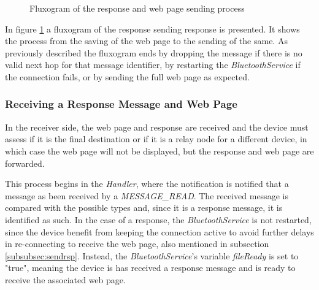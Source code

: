 \begin{figure}[ht]
   \noindent{}
	\caption{\label{fig:rspsendflux} Fluxogram of the response and web page sending process}
\end{figure}

In figure \ref{fig:rspsendflux} a fluxogram of the response sending response is presented. It shows the process from the saving of the web page to the sending of the same. As previously described the fluxogram ends by dropping the message if there is no valid next hop for that message identifier, by restarting the \textit{BluetoothService} if the connection fails, or by sending the full web page as expected.

\subsubsection{Receiving a Response Message and Web Page}
\label{subsubsec:rcvrsp}

In the receiver side, the web page and response are received and the device must assess if it is the final destination or if it is a relay node for a different device, in which case the web page will not be displayed, but the response and web page are forwarded.

This process begins in the \textit{Handler}, where the notification is notified that a message as been received by a \textit{MESSAGE\_READ}. The received message is compared with the possible types and, since it is a response message, it is identified as such. In the case of a response, the \textit{BluetoothService} is not restarted, since the device benefit from keeping the connection active to avoid further delays in re-connecting to receive the web page, also mentioned in subsection \ref{subsubsec:sendrsp}. Instead, the \textit{BluetoothService}'s variable \textit{fileReady} is set to "true", meaning the device is has received a response message and is ready to receive the associated web page.

